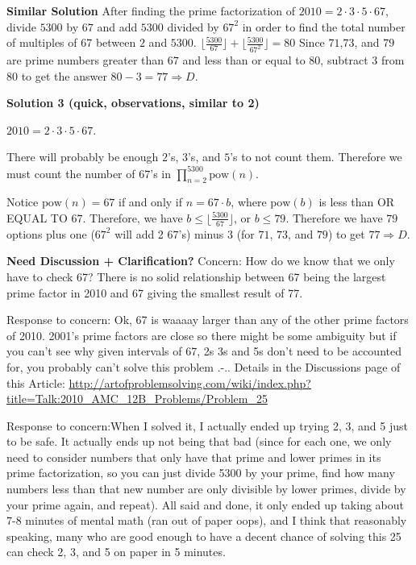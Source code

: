 \begin{enumerate}
 \textbf{Similar Solution} After finding the prime factorization of $2010=2\cdot3\cdot5\cdot67$, divide $5300$ by $67$ and add $5300$ divided by $67^2$ in order to find the total number of multiples of $67$ between $2$ and $5300$. $\lfloor\frac{5300}{67}\rfloor+\lfloor\frac{5300}{67^2}\rfloor=80$ Since $71$,$73$, and $79$ are prime numbers greater than $67$ and less than or equal to $80$, subtract $3$ from $80$ to get the answer $80-3=\boxed{77}\Rightarrow\boxed{D}$.

 



\textbf{Solution 3 (quick, observations, similar to 2)}

$2010 = 2\cdot3\cdot5\cdot67$.

 There will probably be enough $2$'s, $3$'s, and $5$'s to not count them. Therefore we must count the number of $67$'s in $\prod_{n=2}^{5300}\text{pow}(n)$.

 Notice $\text{pow}\left(n\right)=67$ if and only if $n={67}\cdot{b}$, where $\text{pow}\left(b\right)$ is less than OR EQUAL TO $67$. Therefore, we have $b\le\lfloor{\frac{5300}{67}}\rfloor$, or $b\le{79}$. Therefore we have $79$ options plus one ($67^2$ will add 2 $67$'s) minus $3$ (for $71$, $73$, and $79$) to get $\boxed{77}\Rightarrow\boxed{D}$.

 \textbf{Need Discussion + Clarification?} Concern: How do we know that we only have to check 67? There is no solid relationship between 67 being the largest prime factor in 2010 and 67 giving the smallest result of 77.

 
Response to concern: Ok, 67 is waaaay larger than any of the other prime factors of 2010. 2001's prime factors are close so there might be some ambiguity but if you can't see why given intervals of 67, 2s 3s and 5s don't need to be accounted for, you probably can't solve this problem .-.. Details in the Discussions page of this Article: \href{https://artofproblemsolving.comhttp://artofproblemsolving.com/wiki/index.php?title=Talk:2010\_AMC\_12B\_Problems/Problem\_25}{http://artofproblemsolving.com/wiki/index.php?title=Talk:2010\_AMC\_12B\_Problems/Problem\_25}

 
Response to concern:When I solved it, I actually ended up trying 2, 3, and 5 just to be safe. It actually ends up not being that bad (since for each one, we only need to consider numbers that only have that prime and lower primes in its prime factorization, so you can just divide 5300 by your prime, find how many numbers less than that new number are only divisible by lower primes, divide by your prime again, and repeat). All said and done, it only ended up taking about 7-8 minutes of mental math (ran out of paper oops), and I think that reasonably speaking, many who are good enough to have a decent chance of solving this 25 can check 2, 3, and 5 on paper in 5 minutes.

 


\end{enumerate}